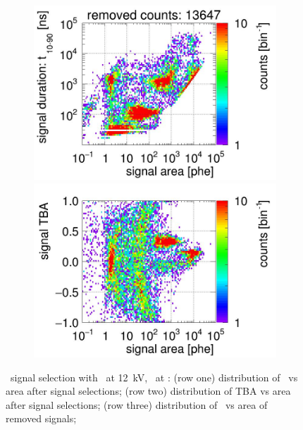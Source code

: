 \begin{landscape}
\begin{figure}[!p]
\begin{subfigure}[t]{0.32\textwidth}
			\includegraphics[width=\figurewidth,clip,trim={0 98 0 15}]{Figures/GasTest/CutsValid/res64767/pdpaX29Vecfig64767.jpg}
			\includegraphics[width=\figurewidth,clip,trim={0 8 0 40}]{Figures/GasTest/CutsValid/res64767/tbapaX29Vecfig64767.jpg}
			\caption{}
			\label{fig:signal selection dv 12 04}
		\end{subfigure}
		\caption[\gtest\ signal selection with \opdv\ at \SI{12}{\kV}, \opgd\ at \standarddensity .]{\gtest\ signal selection with \opdv\ at \SI{12}{\kV}, \opgd\ at \standarddensity : 
			(row one) distribution of \rpdshort\ vs area after signal selections;
(row two) distribution of TBA vs area after signal selections;
(row three) distribution of \rpdshort\ vs area of removed signals;
}
\end{figure}
\end{landscape}
